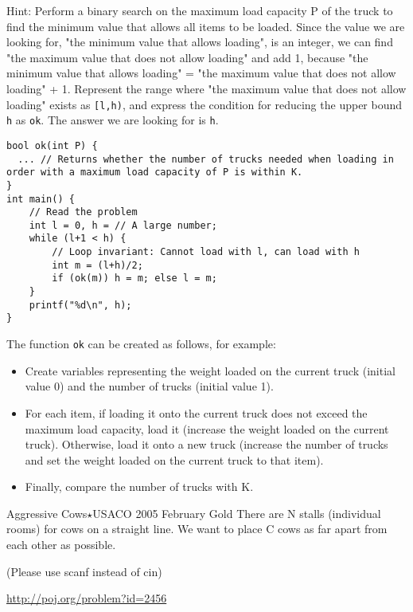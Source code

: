 Hint: Perform a binary search on the maximum load capacity P of the truck to find the minimum value that allows all items to be loaded.
Since the value we are looking for, "the minimum value that allows loading", is an integer, we can find "the maximum value that does not allow loading" and add 1, because "the minimum value that allows loading" = "the maximum value that does not allow loading" + 1.
Represent the range where "the maximum value that does not allow loading" exists as \texttt{[l,h)}, and express the condition for reducing the upper bound \texttt{h} as \texttt{ok}. The answer we are looking for is \texttt{h}.
\begin{cbox}[emph={l,h}]
\begin{verbatim}
bool ok(int P) {
  ... // Returns whether the number of trucks needed when loading in order with a maximum load capacity of P is within K.
}
int main() {
    // Read the problem
    int l = 0, h = // A large number;
    while (l+1 < h) {
        // Loop invariant: Cannot load with l, can load with h
        int m = (l+h)/2;
        if (ok(m)) h = m; else l = m;
    }
    printf("%d\n", h);
}
\end{verbatim}
\end{cbox}

The function \texttt{ok} can be created as follows, for example:
\begin{itemize}
    \item Create variables representing the weight loaded on the current truck (initial value 0) and the number of trucks (initial value 1).
    \item For each item, if loading it onto the current truck does not exceed the maximum load capacity, load it (increase the weight loaded on the current truck). Otherwise, load it onto a new truck (increase the number of trucks and set the weight loaded on the current truck to that item).
    \item Finally, compare the number of trucks with K.
\end{itemize}

\begin{psbox}{Aggressive Cows$\star$}{USACO 2005 February Gold}
There are N stalls (individual rooms) for cows on a straight line. We want to place C cows as far apart from each other as possible.

(Please use scanf instead of cin)

\url{http://poj.org/problem?id=2456}
\end{psbox}

